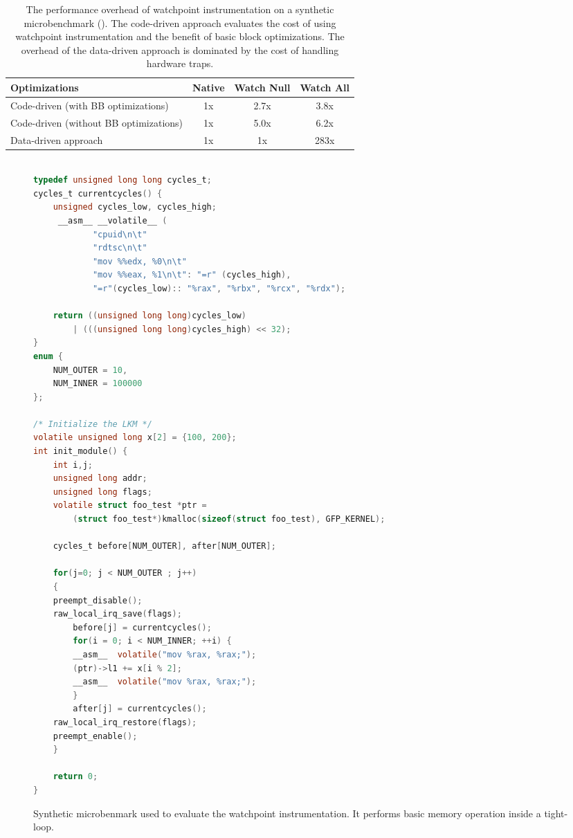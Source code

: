 \begin{table}
\begin{center}
\begin{tabular}{|l|c c c|}
  \hline
  Optimizations & Native & Watch Null & Watch All \\
  \hline
  Code-driven (with BB optimizations)  & 1x & 2.7x & 3.8x \\
  \hline
  Code-driven (without BB optimizations) & 1x & 5.0x &	6.2x \\
  \hline
  Data-driven approach  & 1x & 1x & 283x \\
  \hline
\end{tabular}
\caption[Performance impact of watchpoint instrumentation on microbenchmark.]{\label{table:microbenchmark_optimizations}The performance overhead of watchpoint instrumentation on a synthetic microbenchmark (). The code-driven approach evaluates the cost of using watchpoint instrumentation and the benefit of basic block optimizations. The overhead of the data-driven approach is dominated by the cost of handling hardware traps.}
\end{center}
\end{table}


\begin{figure}
\begin{lstlisting}[language=C,basicstyle=\footnotesize\ttfamily]

typedef unsigned long long cycles_t;
cycles_t currentcycles() {
    unsigned cycles_low, cycles_high;
     __asm__ __volatile__ (
			"cpuid\n\t"
			"rdtsc\n\t"
			"mov %%edx, %0\n\t"
			"mov %%eax, %1\n\t": "=r" (cycles_high), 
			"=r"(cycles_low):: "%rax", "%rbx", "%rcx", "%rdx");

    return ((unsigned long long)cycles_low) 
		| (((unsigned long long)cycles_high) << 32);
}
enum {
	NUM_OUTER = 10,
	NUM_INNER = 100000
};

/* Initialize the LKM */
volatile unsigned long x[2] = {100, 200};
int init_module() {
    int i,j;
    unsigned long addr;
    unsigned long flags;
    volatile struct foo_test *ptr = 
		(struct foo_test*)kmalloc(sizeof(struct foo_test), GFP_KERNEL);

    cycles_t before[NUM_OUTER], after[NUM_OUTER];

    for(j=0; j < NUM_OUTER ; j++)
    {
	preempt_disable();
	raw_local_irq_save(flags);
    	before[j] = currentcycles();
    	for(i = 0; i < NUM_INNER; ++i) {
		__asm__  volatile("mov %rax, %rax;");
		(ptr)->l1 += x[i % 2];
		__asm__  volatile("mov %rax, %rax;");
    	}
    	after[j] = currentcycles();
	raw_local_irq_restore(flags);
	preempt_enable();
    }
  
    return 0;
}
\end{lstlisting}
\vspace{-10pt}
\caption[The synthetic microbenchmark used to evaluate the watchpoint framework.]{\label{fig:microbenchmark}Synthetic microbenmark used to evaluate the watchpoint instrumentation. It performs basic memory operation inside a tight-loop.}
\end{figure}

